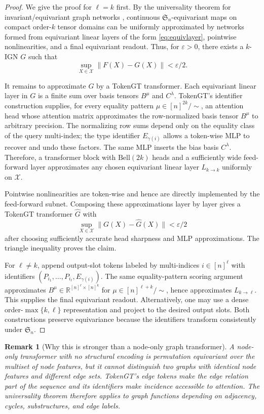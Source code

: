\documentclass[11pt]{article}
\newtheorem{remark}[theorem]{Remark}
\newcommand{\R}{\mathbb{R}}
\newcommand{\Sn}{\mathfrak{S}_n}
\newcommand{\cX}{\mathcal{X}}
\newcommand{\eps}{\varepsilon}
\newcommand{\bell}{\mathrm{Bell}}
\begin{document}
\begin{proof}
We give the proof for $\ell=k$ first.  By the universality theorem for invariant/equivariant graph networks \cite{maron2019universality,keriven2019universal}, continuous $\Sn$-equivariant maps on compact order-$k$ tensor domains can be uniformly approximated by networks formed from equivariant linear layers of the form \eqref{eq:equivlayer}, pointwise nonlinearities, and a final equivariant readout.  Thus, for $\eps>0$, there exists a $k$-IGN $G$ such that
\[
  \sup_{X\in\cX}\|F(X)-G(X)\|<\eps/2.
\]

It remains to approximate $G$ by a TokenGT transformer.  Each equivariant linear layer in $G$ is a finite sum over basis tensors $B^\mu$ and $C^\lambda$.  TokenGT's identifier construction supplies, for every equality pattern $\mu\in [n]^{2k}/\!\sim$, an attention head whose attention matrix approximates the row-normalized basis tensor $B^\mu$ to arbitrary precision.  The normalizing row sums depend only on the equality class of the query multi-index; the type identifier $E_{\gamma(i)}$ allows a token-wise MLP to recover and undo these factors.  The same MLP inserts the bias basis $C^\lambda$.  Therefore, a transformer block with $\bell(2k)$ heads and a sufficiently wide feed-forward layer approximates any chosen equivariant linear layer $L_{k\to k}$ uniformly on $\cX$.

Pointwise nonlinearities are token-wise and hence are directly implemented by the feed-forward subnet.  Composing these approximations layer by layer gives a TokenGT transformer $\widehat G$ with
\[
  \sup_{X\in\cX}\|G(X)-\widehat G(X)\|<\eps/2
\]
after choosing sufficiently accurate head sharpness and MLP approximations.  The triangle inequality proves the claim.

For $\ell\ne k$, append output-slot tokens labeled by multi-indices $i\in[n]^\ell$ with identifiers $(P_{i_1},\dots,P_{i_\ell},E_{\gamma(i)})$.  The same equality-pattern scoring argument approximates $B^\mu\in \R^{[n]^\ell\times [n]^k}$ for $\mu\in [n]^{\ell+k}/\!\sim$, hence approximates $L_{k\to\ell}$.  This supplies the final equivariant readout.  Alternatively, one may use a dense order-$\max\{k,\ell\}$ representation and project to the desired output slots.  Both constructions preserve equivariance because the identifiers transform consistently under $\Sn$.
\end{proof}

\begin{remark}[Why this is stronger than a node-only graph transformer]
A node-only transformer with no structural encoding is permutation equivariant over the multiset of node features, but it cannot distinguish two graphs with identical node features and different edge sets.  TokenGT's edge tokens make the edge relation part of the sequence and its identifiers make incidence accessible to attention.  The universality theorem therefore applies to graph functions depending on adjacency, cycles, substructures, and edge labels.
\end{remark}
\end{document}
